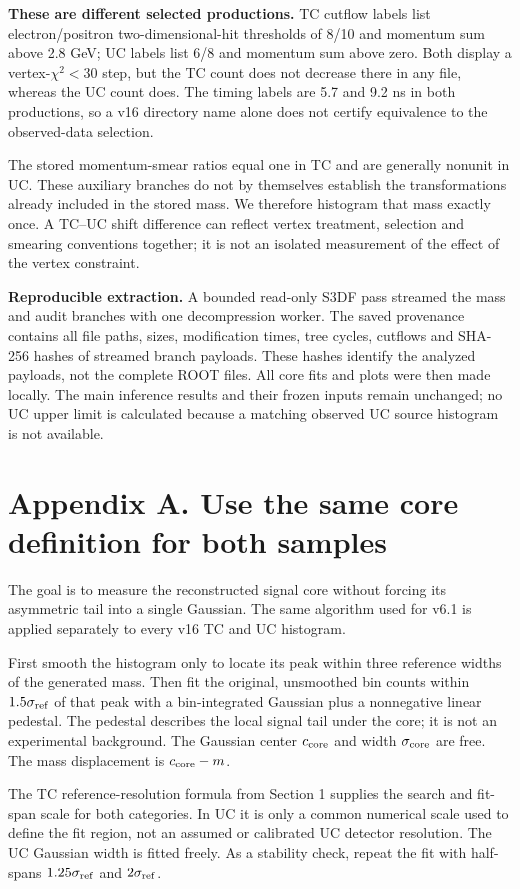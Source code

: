\documentclass[11pt]{article}
\begin{document}
\textbf{These are different selected productions.} TC cutflow labels list electron/positron two-dimensional-hit thresholds of 8/10 and momentum sum above 2.8 GeV; UC labels list 6/8 and momentum sum above zero. Both display a vertex-$\chi^2<30$ step, but the TC count does not decrease there in any file, whereas the UC count does. The timing labels are 5.7 and 9.2 ns in both productions, so a v16 directory name alone does not certify equivalence to the observed-data selection.

The stored momentum-smear ratios equal one in TC and are generally nonunit in UC. These auxiliary branches do not by themselves establish the transformations already included in the stored mass. We therefore histogram that mass exactly once. A TC--UC shift difference can reflect vertex treatment, selection and smearing conventions together; it is not an isolated measurement of the effect of the vertex constraint.

\textbf{Reproducible extraction.} A bounded read-only S3DF pass streamed the mass and audit branches with one decompression worker. The saved provenance contains all file paths, sizes, modification times, tree cycles, cutflows and SHA-256 hashes of streamed branch payloads. These hashes identify the analyzed payloads, not the complete ROOT files. All core fits and plots were then made locally. The main inference results and their frozen inputs remain unchanged; no UC upper limit is calculated because a matching observed UC source histogram is not available.
\clearpage\section*{Appendix A. Use the same core definition for both samples}

The goal is to measure the reconstructed signal core without forcing its asymmetric tail into a single Gaussian. The same algorithm used for v6.1 is applied separately to every v16 TC and UC histogram.

First smooth the histogram only to locate its peak within three reference widths of the generated mass. Then fit the original, unsmoothed bin counts within $1.5\sigma_{\rm ref}$ of that peak with a bin-integrated Gaussian plus a nonnegative linear pedestal. The pedestal describes the local signal tail under the core; it is not an experimental background. The Gaussian center $c_{\rm core}$ and width $\sigma_{\rm core}$ are free. The mass displacement is $c_{\rm core}-m$.

The TC reference-resolution formula from Section 1 supplies the search and fit-span scale for both categories. In UC it is only a common numerical scale used to define the fit region, not an assumed or calibrated UC detector resolution. The UC Gaussian width is fitted freely. As a stability check, repeat the fit with half-spans $1.25\sigma_{\rm ref}$ and $2\sigma_{\rm ref}$.
\end{document}
